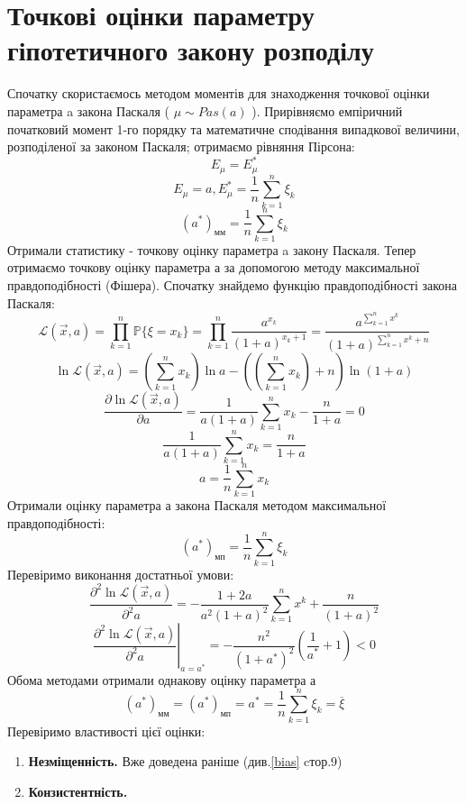 \documentclass{article}
\begin{document}
\section{Точкові оцінки параметру гіпотетичного закону розподілу}
Спочатку скористаємось методом моментів для знаходження точкової 
оцінки параметра a закона Паскаля ( $\mu \sim Pas(a)$ ).
\newline
Прирівняємо емпіричний початковий момент 1-го порядку та математичне 
сподівання випадкової величини, розподіленої за законом Паскаля; 
отримаємо рівняння Пірсона: 
$$E_\mu = E^*_\mu$$
$$E_\mu = a, E^*_\mu = \frac{1}{n} \sum_{k = 1}^n \xi_k$$
\begin{equation}
  (a^*)_\text{мм} = \frac{1}{n} \sum_{k = 1}^n \xi_k
\end{equation}
Отримали статистику - точкову оцінку параметра a закону Паскаля.
\newline
Тепер отримаємо точкову оцінку параметра а за допомогою методу 
максимальної правдоподібності (Фішера). Спочатку знайдемо функцію 
правдоподібності закона Паскаля: 
$$\mathcal{L}( \vec{x}, a ) = \prod_{k = 1}^n \mathbb{P} 
\{\xi = x_k\} = \prod_{k = 1}^n \frac{a^{x_k}}{(1 + a)^{x_k + 1}} = 
\frac{a^{\sum_{k =1}^n x^k}}{(1 + a)^{\sum_{k =1}^n x^k + n}}$$
$$\ln \mathcal{L}( \vec{x}, a ) = (\sum_{k=1}^n x_k)\ln a - 
((\sum_{k=1}^n x_k) + n)\ln(1+a)$$
$$\frac{\partial\ln \mathcal{L}( \vec{x}, a )}{\partial a} = 
\frac{1}{a(1+a)}\sum_{k=1}^n x_k - \frac{n}{1+a} = 0$$
$$\frac{1}{a(1+a)}\sum_{k=1}^n x_k = \frac{n}{1+a}$$
$$a = \frac{1}{n} \sum_{k=1}^n x_k$$
Отримали оцінку параметра а закона Паскаля методом 
максимальної правдоподібності:
\begin{equation}
  (a^*)_\text{мп} = \frac{1}{n}\sum_{k=1}^n \xi_k
\end{equation}
Перевіримо виконання достатньої умови:
$$\frac{\partial^2\ln \mathcal{L}( \vec{x}, a )}{\partial^2 a} = 
-\frac{1+2a}{a^2(1+a)^2}\sum_{k=1}^n x^k + \frac{n}{(1+a)^2}$$
\begin{equation}
  \left.{\frac{\partial^2\ln \mathcal{L}( \vec{x}, a )}{\partial^2 a}}
  \right|_{a = a^*} = -\frac{n^2}{(1+a^*)^2}({\frac{1}{a^*} + 1}) < 0
\end{equation}
Обома методами отримали однакову оцінку параметра а
$$(a^*)_{\text{мм}} = (a^*)_{\text{мп}} = a^* = \frac{1}{n}
\sum_{k=1}^n \xi_k = \overline{\xi}$$
Перевіримо властивості цієї оцінки:
\begin{enumerate}
  \item \textbf{Незміщенність.} Вже доведена раніше (див.\ref{bias} cтор.9)
  \item \textbf{Конзистентність.}
\end{enumerate}
\end{document}
